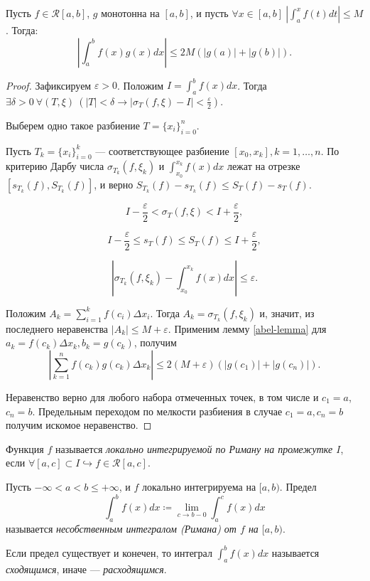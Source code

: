 \begin{lemma}[Абель]
    Пусть $f \in \mathcal{R}[a, b]$, $g$ монотонна на $[a, b]$, и пусть $\forall x \in [a, b] \ \left|\int_a^x f(t) dt\right| \le M$. Тогда:
    \[
        \left|\int_a^b f(x) g(x) dx\right| \le 2M(|g(a)| + |g(b)|).
    \]

    \begin{proof}
        Зафиксируем $\varepsilon > 0$. Положим $I = \int_a^b f(x) dx$. Тогда $\exists \delta > 0 \ \forall (T, \xi) \ (|T| < \delta \rightarrow |\sigma_T (f, \xi) - I| < \frac{\varepsilon}{2})$.

        Выберем одно такое разбиение $T = \{x_i\}_{i=0}^{n}$.

        Пусть $T_k = \{x_i\}_{i=0}^k$ --- соответствующее разбиение $[x_0, x_k], k = 1, \ldots, n$. По критерию Дарбу числа $\sigma_{T_k} (f, \xi_k)$ и $\int_{x_0}^{x_k} f(x) dx$ лежат на отрезке $[s_{T_k}(f), S_{T_k}(f)]$, и верно $S_{T_k}(f) - s_{T_k}(f) \le S_T(f) - s_T(f)$.

        \[
            I - \frac{\varepsilon}{2} < \sigma_T (f, \xi) < I + \frac{\varepsilon}{2} ,
        \]

        \[
            I - \frac{\varepsilon}{2} \le s_T(f) \le S_T(f) \le I + \frac{\varepsilon}{2},
        \]

        \[
            \left|\sigma_{T_k} (f, \xi_k) - \int_{x_0}^{x_k} f(x) dx\right| \le \varepsilon.
        \]

        Положим $A_k = \sum_{i = 1}^k f(c_i) \Delta x_i.$ Тогда $A_k = \sigma_{T_k}(f, \xi_k)$ и, значит, из последнего неравенства $|A_k| \le M + \varepsilon$.
        Применим лемму \ref{abel-lemma} для $a_k = f(c_k) \Delta x_k, b_k = g(c_k)$, получим
        \[
            \left|\sum_{k=1}^n f(c_k) g(c_k) \Delta x_k\right| \le 2(M + \varepsilon)(|g(c_1)| + |g(c_n)|).
        \]

        Неравенство верно для любого набора отмеченных точек, в том числе и $c_1 = a$, $c_n = b$. Предельным переходом по мелкости разбиения в случае $c_1 = a, c_n = b$ получим искомое неравенство.
    \end{proof}
\end{lemma}

\begin{definition}
    Функция $f$ называется \emph{локально интегрируемой по Риману на промежутке $I$}, если $\forall [a, c] \subset I \hookrightarrow f \in \mathcal{R}[a, c]$.
\end{definition}

\begin{definition}
    Пусть $-\infty < a < b \le +\infty$, и $f$ локально интегрируема на $[a, b)$. Предел
    \[
        \int_a^b f(x) dx \coloneqq \lim_{c \rightarrow b-0} \int_a^c f(x) dx
    \]
    называется \emph{несобственным интегралом (Римана) от $f$ на $[a, b)$}.

    Если предел существует и конечен, то интеграл $\int_a^b f(x) dx$ называется \emph{сходящимся}, иначе --- \emph{расходящимся}.
\end{definition}

